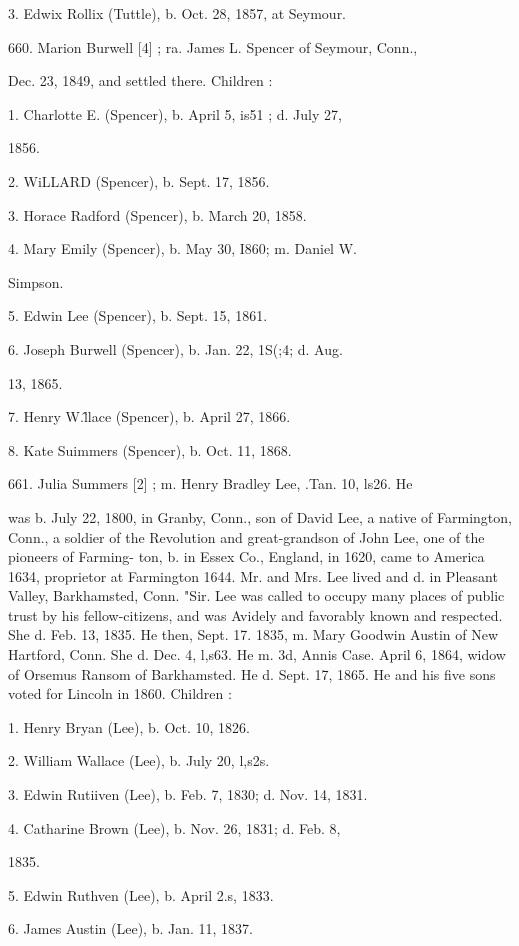 3. Edwix Rollix (Tuttle), b. Oct. 28, 1857, at Seymour. 

660. Marion Burwell [4] ; ra. James L. Spencer of Seymour, Conn., 

Dec. 23, 1849, and settled there. Children : 

1. Charlotte E. (Spencer), b. April 5, is51 ; d. July 27, 

1856. 

2. WiLLARD (Spencer), b. Sept. 17, 1856. 

3. Horace Radford (Spencer), b. March 20, 1858. 

4. Mary Emily (Spencer), b. May 30, I860; m. Daniel W. 

Simpson. 

5. Edwin Lee (Spencer), b. Sept. 15, 1861. 

6. Joseph Burwell (Spencer), b. Jan. 22, 1S(;4; d. Aug. 

13, 1865. 

7. Henry W.\^llace (Spencer), b. April 27, 1866. 

8. Kate Suimmers (Spencer), b. Oct. 11, 1868. 

661. Julia Summers [2] ; m. Henry Bradley Lee, .Tan. 10, ls26. He 

was b. July 22, 1800, in Granby, Conn., son of David Lee, a 
native of Farmington, Conn., a soldier of the Revolution and 
great-grandson of John Lee, one of the pioneers of Farming- 
ton, b. in Essex Co., England, in 1620, came to America 1634, 
proprietor at Farmington 1644. Mr. and Mrs. Lee lived and 
d. in Pleasant Valley, Barkhamsted, Conn. "Sir. Lee was called 
to occupy many places of public trust by his fellow-citizens, 
and was Avidely and favorably known and respected. She d. 
Feb. 13, 1835. He then, Sept. 17. 1835, m. Mary Goodwin 
Austin of New Hartford, Conn. She d. Dec. 4, l,s63. He m. 
3d, Annis Case. April 6, 1864, widow of Orsemus Ransom of 
Barkhamsted. He d. Sept. 17, 1865. He and his five sons 
voted for Lincoln in 1860. Children : 

1. Henry Bryan (Lee), b. Oct. 10, 1826. 

2. William Wallace (Lee), b. July 20, l,s2s. 

3. Edwin Rutiiven (Lee), b. Feb. 7, 1830; d. Nov. 14, 1831. 

4. Catharine Brown (Lee), b. Nov. 26, 1831; d. Feb. 8, 

1835. 

5. Edwin Ruthven (Lee), b. April 2.s, 1833. 

6. James Austin (Lee), b. Jan. 11, 1837. 

